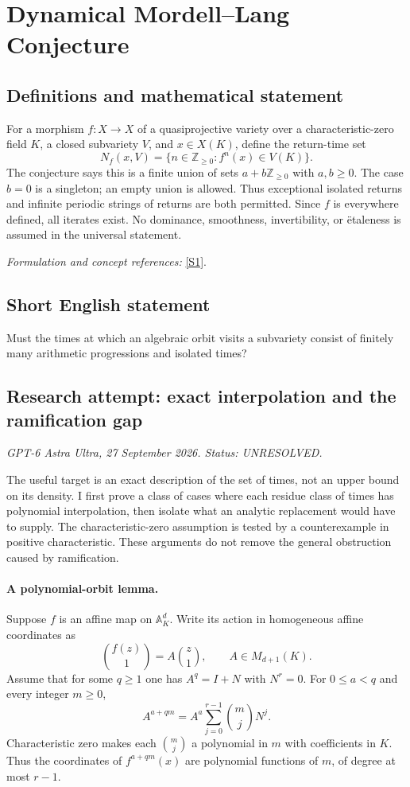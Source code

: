 \documentclass[11pt]{article}
\begin{document}
\section*{\texorpdfstring{Dynamical Mordell–Lang Conjecture}{Dynamical Mordell–Lang Conjecture}}\label{statement}
\subsection{Definitions and mathematical statement}
For a morphism $f:X\to X$ of a quasiprojective variety over a characteristic-zero field $K$, a closed subvariety $V$, and $x\in X(K)$, define the return-time set
\[
 N_f(x,V)=\{n\in{\mathbb{Z}}_{\ge0}:f^n(x)\in V(K)\}.
\]
The conjecture says this is a finite union of sets $a+b{\mathbb{Z}}_{\ge0}$ with $a,b\ge0$. The case $b=0$ is a singleton; an empty union is allowed. Thus exceptional isolated returns and infinite periodic strings of returns are both permitted. Since $f$ is everywhere defined, all iterates exist. No dominance, smoothness, invertibility, or \"etaleness is assumed in the universal statement.
\par\smallskip\textit{Formulation and concept references:} \href{https://arxiv.org/pdf/2602.08608v2}{[S1]}.

\subsection{Short English statement}
Must the times at which an algebraic orbit visits a subvariety consist of finitely many arithmetic progressions and isolated times?
\subsection{Research attempt: exact interpolation and the ramification gap}
\textit{GPT-6 Astra Ultra, 27 September 2026. Status: UNRESOLVED.}

The useful target is an exact description of the set of times, not an upper bound on its density. I first prove a class of cases where each residue class of times has polynomial interpolation, then isolate what an analytic replacement would have to supply. The characteristic-zero assumption is tested by a counterexample in positive characteristic. These arguments do not remove the general obstruction caused by ramification.

\paragraph{A polynomial-orbit lemma.}
Suppose $f$ is an affine map on $\mathbb A^d_K$. Write its action in homogeneous affine coordinates as
\[
 \binom{f(z)}1=A\binom z1,
 \qquad A\in M_{d+1}(K).
\]
Assume that for some $q\ge1$ one has $A^q=I+N$ with $N^r=0$. For $0\le a<q$ and every integer $m\ge0$,
\[
 A^{a+qm}=A^a\sum_{j=0}^{r-1}\binom mjN^j.                 \tag{1}
\]
Characteristic zero makes each $\binom mj$ a polynomial in $m$ with coefficients in $K$. Thus the coordinates of $f^{a+qm}(x)$ are polynomial functions of $m$, of degree at most $r-1$.
\end{document}
